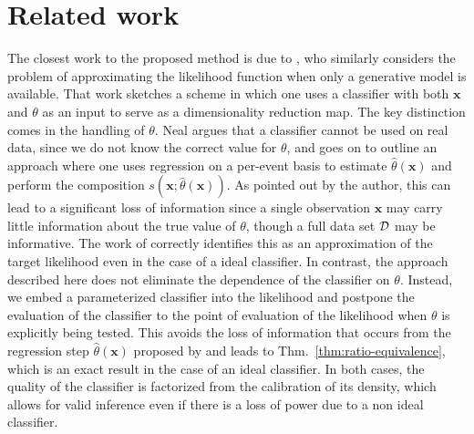 \documentclass[12pt]{article}
\numberwithin{equation}{section}
\theoremstyle{plain}
\newcommand{\glnote}[1]{\textcolor{red}{[GL: #1]}}
\begin{document}

\section{Related work}
\label{sec:related}

The closest work to the proposed method is due to \cite{Neal:2007zz}, who
similarly considers the problem of approximating the likelihood function when
only a generative model is available. That work sketches a scheme in which one
uses a classifier with both $\mathbf{x}$ and $\theta$ as an input to serve as a
dimensionality reduction map. The key distinction comes in the handling of
$\theta$.  Neal argues that a classifier cannot be used on real data, since we
do not know the correct value for $\theta$, and goes on to outline an approach
where one uses regression on a per-event basis to estimate
$\hat{\theta}(\mathbf{x})$ and perform the composition $s(\mathbf{x};
\hat{\theta}(\mathbf{x}))$. As pointed out by the author, this can lead to a
significant loss of information since a single observation $\mathbf{x}$ may
carry little information about the true value of $\theta$, though a full data
set ${\cal D}$ may be informative.
The work of \cite{Neal:2007zz} correctly identifies this as
an approximation of the target likelihood even in the case of a ideal
classifier. In contrast, the approach described here does not eliminate the
dependence of the classifier on $\theta$.
Instead, we embed a parameterized classifier
into the likelihood and postpone the evaluation of the classifier to the point
of evaluation of the likelihood when $\theta$ is explicitly being tested. This
avoids the loss of information that occurs from the regression step
$\hat{\theta}(\mathbf{x})$ proposed by \cite{Neal:2007zz} and leads to
Thm.~\ref{thm:ratio-equivalence}, which is an exact result in the case of an
ideal classifier. In both cases, the quality of the classifier is factorized
from the calibration of its density, which allows for valid inference even if
there is a loss of power due to a non ideal classifier.
\end{document}
